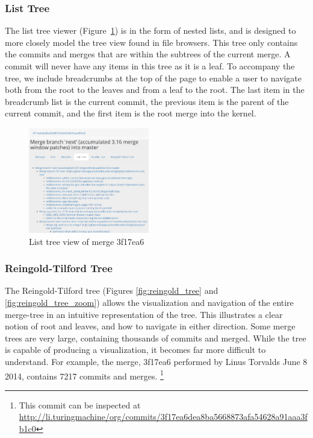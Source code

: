 \subsubsection{List Tree}

The list tree viewer (Figure~\ref{fig:list_tree}) is in the form of
nested lists, and is designed to more closely model the tree view found
in file browsers. This tree only contains the commits and merges that
are within the subtrees of the current merge. A commit will never have
any items in this tree as it is a leaf. To accompany the tree, we
include breadcrumbs at the top of the page to enable a user to navigate
both from the root to the leaves and from a leaf to the root. The last
item in the breadcrumb list is the current commit, the previous item is
the parent of the current commit, and the first item is the root merge
into the kernel.

\begin{figure}
        \centering
        \includegraphics[width=0.47\textwidth]{figures/list_tree.png}
        \caption{List tree view of merge 3f17ea6}
        \label{fig:list_tree}
\end{figure}

\subsubsection{Reingold-Tilford Tree}

The Reingold-Tilford tree\cite{Reingold1981} (Figures
\ref{fig:reingold_tree} and \ref{fig:reingold_tree_zoom}) allows the
visualization and navigation of the entire merge-tree in an intuitive
representation of the tree.  This illustrates a clear notion of root and
leaves, and how to navigate in either direction. Some merge trees are
very large, containing thousands of commits and merged. While the tree
is capable of producing a visualization, it becomes far more difficult
to understand. For example, the merge, 3f17ea6 performed by Linus
Torvalds June 8 2014, contains 7217 commits and merges. \footnote{This
  commit can be inspected at
  \url{http://li.turingmachine/org/commits/3f17ea6dea8ba5668873afa54628a91aaa3fb1c0}}

